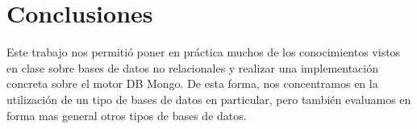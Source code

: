 \section{Conclusiones}

Este trabajo nos permiti\'o poner en pr\'actica muchos de los conocimientos vistos en clase sobre bases de datos no relacionales y realizar una implementaci\'on concreta sobre el motor DB Mongo. De esta forma, nos concentramos en la utilizaci\'on de un tipo de bases de datos en particular, pero tambi\'en evaluamos en forma mas general otros tipos de bases de datos.
